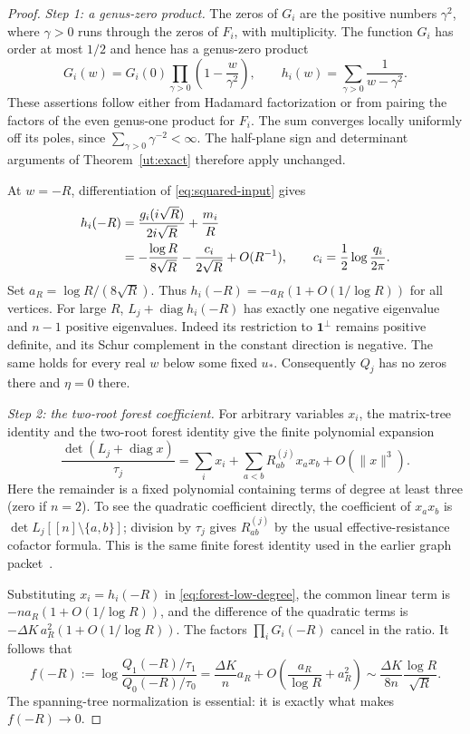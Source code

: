 \begin{proof}
\emph{Step 1: a genus-zero product.}
The zeros of $G_i$ are the positive numbers $\gamma^2$, where $\gamma>0$
runs through the zeros of $F_i$, with multiplicity.  The function $G_i$
has order at most $1/2$ and hence has a genus-zero product
\[
 G_i(w)=G_i(0)\prod_{\gamma>0}
              \left(1-\frac{w}{\gamma^2}\right),
 \qquad
 h_i(w)=\sum_{\gamma>0}\frac{1}{w-\gamma^2}.
\]
These assertions follow either from Hadamard factorization or from
pairing the factors of the even genus-one product for $F_i$.
The sum converges locally uniformly off its poles, since
$\sum_{\gamma>0}\gamma^{-2}<\infty$.
The half-plane sign and determinant arguments of Theorem~\ref{ut:exact}
therefore apply unchanged.

At $w=-R$, differentiation of \eqref{eq:squared-input} gives
\begin{align}
 h_i(-R)
 &=\frac{g_i(i\sqrt R)}{2i\sqrt R}+\frac{m_i}{R}\notag\\
 &=-\frac{\log R}{8\sqrt R}
      -\frac{c_i}{2\sqrt R}+O(R^{-1}),
 \qquad c_i=\frac12\log\frac{q_i}{2\pi}.
 \label{eq:squared-radial}
\end{align}
Set $a_R=\log R/(8\sqrt R)$.  Thus
$h_i(-R)=-a_R(1+O(1/\log R))$ for all vertices.  For large $R$,
$L_j+\operatorname{diag}h_i(-R)$ has exactly one negative eigenvalue
and $n-1$ positive eigenvalues.  Indeed its restriction to
$\boldsymbol1^\perp$ remains positive definite, and its Schur complement
in the constant direction is negative.  The same holds for every real
$w$ below some fixed $u_*$.  Consequently $Q_j$ has no zeros there and
$\eta=0$ there.

\emph{Step 2: the two-root forest coefficient.}
For arbitrary variables $x_i$, the matrix-tree identity and the
two-root forest identity give the finite polynomial expansion
\begin{equation}\label{eq:forest-low-degree}
 \frac{\det(L_j+\operatorname{diag}x)}{\tau_j}
   =\sum_i x_i+\sum_{a<b}R^{(j)}_{ab}x_ax_b+O(\|x\|^3).
\end{equation}
Here the remainder is a fixed polynomial containing terms of degree
at least three (zero if $n=2$).  To see the quadratic coefficient
directly, the coefficient of $x_ax_b$ is
$\det L_j[[n]\setminus\{a,b\}]$; division by $\tau_j$ gives
$R^{(j)}_{ab}$ by the usual effective-resistance cofactor formula.
This is the same finite forest identity used in the earlier graph
packet~\cite{priorgraph}.

Substituting $x_i=h_i(-R)$ in \eqref{eq:forest-low-degree}, the common
linear term is $-na_R(1+O(1/\log R))$, and the difference of the
quadratic terms is $-\Delta K\,a_R^2(1+O(1/\log R))$.
The factors $\prod_iG_i(-R)$ cancel in the ratio.  It follows that
\begin{equation}\label{eq:electrical-log-asymptotic}
 f(-R):=\log\frac{Q_1(-R)/\tau_1}{Q_0(-R)/\tau_0}
    =\frac{\Delta K}{n}a_R
       +O\left(\frac{a_R}{\log R}+a_R^2\right)
    \sim\frac{\Delta K}{8n}\frac{\log R}{\sqrt R}.
\end{equation}
The spanning-tree normalization is essential: it is exactly what
makes $f(-R)\longrightarrow0$.


\end{proof}
